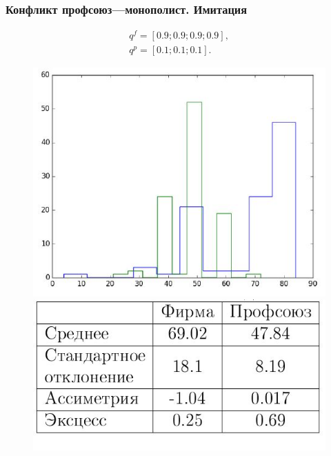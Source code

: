 \documentclass {beamer}
\begin{document}
\begin{frame}
\frametitle{Конфликт профсоюз---монополист. Имитация}
	 \begin{gather*}
	 q^f = \left[ 0.9; 0.9; 0.9; 0.9 \right], \\
	 q^p = \left[ 0.1; 0.1; 0.1 \right].
	 \end{gather*}
		\begin{figure}
			\begin{minipage}[b]{0.45\textwidth}
				
				\includegraphics[width=\textwidth]{firm1}
			\end{minipage}
			\begin{minipage}[b]{0.45\textwidth}
				
				\includegraphics[width=\textwidth]{firmtable1}
			\end{minipage}
			
		\end{figure}
\end{frame}
\end{document}
